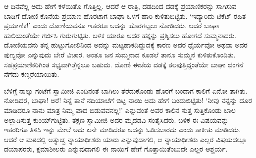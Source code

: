 ಆ ದಿನವೆಲ್ಲ ಅದು ಹೇಗೆ ಕಳೆಯಿತೊ ಗೊತ್ತಿಲ್ಲ. ಆದರೆ ಆ ರಾತ್ರಿ, ದಡದಿಂದ ದಡಕ್ಕೆ ಪ್ರಯಾಣಿಕರನ್ನು ಸಾಗಿಸುವ ಬಾಡಿಗೆ ದೋಣಿ ಕೊನೆಯ ಪ್ರಯಾಣ ಹೊರಟಾಗ ಬಾಘಾ ಒಳಗೆ ಹಾರಿ ಕುಳಿತುಬಿಟ್ಟಿತು. ‘ಇದ್ಯಾರಿದು ಟಿಕೆಟ್ ರಹಿತ ಪ್ರಯಾಣಿಕ!’ ಎಂದು ದೋಣಿಯವನೂ ಇತರರೂ ಅದನ್ನು ಹೊರಗಟ್ಟಲು ನೋಡಿದರು. ಆದರೆ ಬಾಘಾ ಹುಲಿಯಂತೆಯೇ ಗರ್ಜಿಸಿ ಗುರುಗುಟ್ಟಿತು. ಬಳಿಕ ಯಾರೂ ಅದರ ಹಕ್ಕನ್ನು ಪ್ರಶ್ನಿಸಲು ಹೋಗದೆ ಸುಮ್ಮನಾದರು. ದೋಣಿಯವನು ತನ್ನ ಹುಟ್ಟುಗೋಲಿನಿಂದ ಅದನ್ನು ಮಟ್ಟಹಾಕದಿದ್ದುದಕ್ಕೆ ಕಾರಣ ಅದರ ಧೈರ್ಯವೋ ಅಥವಾ ಅದರ ಪುಣ್ಯವೋ ಎನ್ನುವುದು ಬೇರೆ ವಿಚಾರ. ಅಂತೂ ಜನ ಸುಮ್ಮನಾದ ಕೂಡಲೆ ತಾನೂ ಸುಮ್ಮನೆ ಕುಳಿತುಕೊಂಡಿತು. ಸಹಪ್ರಯಾಣಿಕರಿಗಿಂತ ಸಭ್ಯವಾಗಿತ್ತೆನ್ನಲೂ ಬಹುದು. ದೋಣಿ ಈಚೆಯ ದಡಕ್ಕೆ ತಲಪುತ್ತಿದ್ದಂತೆಯೇ ಬಾಘಾ ಛಂಗನೆ ನೆಗೆದು ಕಣ್ಮರೆಯಾಯಿತು.

ಬೆಳಿಗ್ಗೆ ನಾಲ್ಕು ಗಂಟೆಗೆ ಸ್ವಾಮೀಜಿ ಎಂದಿನಂತೆ ಬಾಗಿಲು ತೆರೆದುಕೊಂಡು ಹೊರಗೆ ಬಂದಾಗ ಕಾಲಿಗೆ ಏನೋ ತಾಗಿತು. ನೋಡಿದರೆ, ಬಾಘಾ! ಅರೆ! ನಿನ್ನೆ ತಾನೆ ನದಿಯಾಚೆಗೆ ಬಿಟ್ಟ ನಾಯಿ ಅದು ಹೇಗೆ ಬಂದುಬಿಟ್ಟಿತು! ‘ನೀವು ನನ್ನನ್ನು ದೂರ ಮಾಡಿದರೂ ನಾನು ಮಾತ್ರ ನಿಮ್ಮ ಪಾದ ಬಿಡುವವನಲ್ಲ!’ ಎನ್ನುವಂತೆ ಅವರ ಕಾಲಿನ ಸುತ್ತ ಸುತ್ತಿಕೊಂಡು ಬಾಲ ಅಲ್ಲಾಡಿಸುತ್ತ ಕುಂಯ್​ಗುಟ್ಟಿತು. ತಕ್ಷಣ ಸ್ವಾಮೀಜಿ ಅದರ ಮೈದಡವಿ ಸಂತೈಸಿದರು. ಬಳಿಕ ಈ ವಿಷಯವನ್ನು ಇತರರಿಗೂ ತಿಳಿಸಿ ಇನ್ನು ಮೇಲೆ ಅದು ಏನೇ ಮಾಡಿದರೂ ಅದನ್ನು ಓಡಿಸಬಾರದು ಎಂದು ತಾಕೀತು ಮಾಡಿದರು. ಆದರೆ ಆ ಮಠದಲ್ಲಿ ಅತ್ಯುಚ್ಚ ನ್ಯಾಯಾಧೀಶರು ಯಾರು ಎನ್ನುವುದಾಗಲಿ, ಆ ನ್ಯಾಯಾಧೀಶರು ಎಲ್ಲರ ವಿಷಯದಲ್ಲೂ ದಯಾಪರರು, ಕ್ಷಮಾಶೀಲರು ಎನ್ನುವುದಾಗಲಿ ಈ ನಾಯಿಗೆ ಹೇಗೆ ಗೊತ್ತಾಯಿತೆಂಬುದೇ ಎಲ್ಲರ ಆಶ್ಚರ್ಯ.

